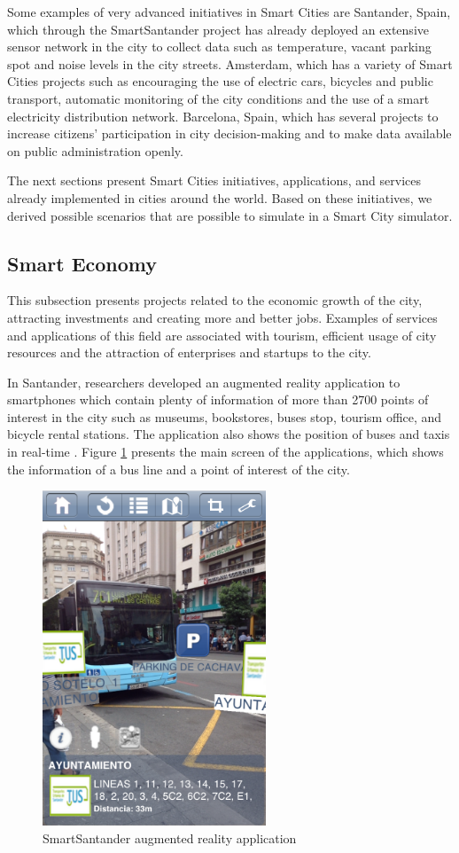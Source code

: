Some examples of very advanced initiatives in Smart Cities are Santander, Spain, which through the SmartSantander project has already deployed an extensive sensor network in the city to collect data such as temperature, vacant parking spot and noise levels in the city streets. Amsterdam, which has a variety of Smart Cities projects such as encouraging the use of electric cars, bicycles and public transport, automatic monitoring of the city conditions and the use of a smart electricity distribution network. Barcelona, Spain, which has several projects to increase citizens' participation in city decision-making and to make data available on public administration openly.

The next sections present Smart Cities initiatives, applications, and services already implemented in cities around the world. Based on these initiatives, we derived possible scenarios that are possible to simulate in a Smart City simulator.

\subsection{Smart Economy}

This subsection presents projects related to the economic growth of the city, attracting investments and creating more and better jobs. Examples of services and applications of this field are associated with tourism, efficient usage of city resources and the attraction of enterprises and startups to the city. 

In Santander, researchers developed an augmented reality application to smartphones which contain plenty of information of more than 2700 points of interest in the city such as museums, bookstores, buses stop, tourism office, and bicycle rental stations. The application also shows the position of buses and taxis in real-time \cite{sanchez2014smartsantander}. Figure \ref{figure:santanderRa} presents the main screen of the applications, which shows the information of a bus line and a point of interest of the city.

\begin{figure}[!htb]
\centering
\includegraphics[height=10cm]{figuras/santanderRA}
\caption{SmartSantander augmented reality application}
\label{figure:santanderRa}
\end{figure}

